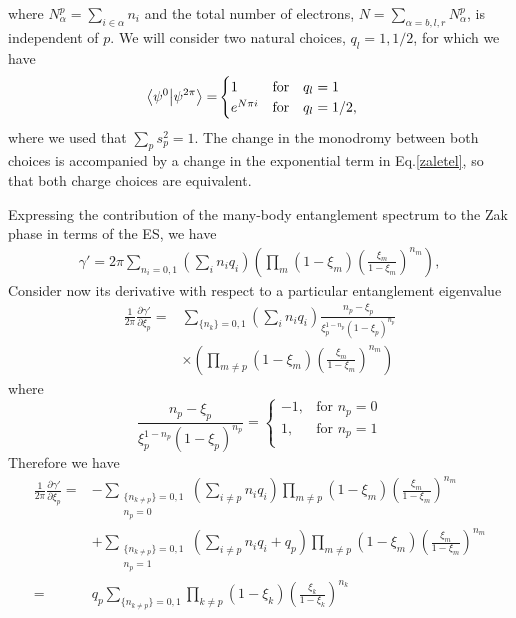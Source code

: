 \documentclass[twocolumn,amsmath,longbibliography,amssymb,superscriptaddress]{revtex4-1}
\begin{document}
where $N^p_\alpha = \sum_{i \in \alpha} n_i$ and the total number of electrons, $N = \sum_{\alpha = b,l,r} N^p_\alpha$, is independent of $p$. We will consider two natural choices, $q_l = 1,1/2$, for which we have
\begin{align}
\bra{\psi^0}\ket{\psi^{2\pi}} =& 
\begin{cases}
1 & \text{for} \quad q_l = 1 \\
e^{N\pi i} & \text{for} \quad q_l = 1/2,
\end{cases}
\end{align}
where we used that $\sum_p s_p^2 = 1$. The change in the monodromy between both choices is accompanied by a change in the exponential term in Eq.\ref{zaletel}, so that both charge choices are equivalent.

Expressing the contribution of the many-body entanglement spectrum to the Zak phase in terms of the ES, we have
\begin{align*}
\gamma' = 2\pi \sum_{n_i = 0,1} \left(\sum_{i } n_i q_i\right) \left(\prod_m (1- \xi_m)\left(\frac{\xi_m}{1-\xi_m} \right)^{n_m} \right) ,
\end{align*} 
Consider now its derivative with respect to a particular entanglement eigenvalue
\begin{align}
\frac{1}{2\pi}\frac{\partial \gamma'}{\partial \xi_p} =& \sum_{\{n_k\}=0,1}\left(\sum_{i } n_i q_i\right)\frac{n_p - \xi_p}{\xi_p^{1-n_p}(1-\xi_p)^{n_p}}\\
&\times \left(\prod_{m\neq p} (1- \xi_m)\left(\frac{\xi_m}{1-\xi_m} \right)^{n_m} \right)
\end{align}
where
\begin{equation}
 \frac{n_p - \xi_p}{\xi_p^{1-n_p}(1-\xi_p)^{n_p}} = 
  \begin{cases}
    -1, & \text{for } n_p=0 \\
    1, & \text{for } n_p = 1 \\
  \end{cases}	
\end{equation}
Therefore we have
\begin{align*}
\frac{1}{2\pi}\frac{\partial \gamma'}{\partial \xi_p} =& -\sum_{\substack{\{n_{k\neq p}\}=0,1 \\ n_p = 0}}\left(\sum_{i \neq p} n_i q_i\right)\prod_{m\neq p} (1-\xi_m)\left( \frac{\xi_m}{1-\xi_m} \right)^{n_m} \\
&+ \sum_{\substack{\{n_{k\neq p}\}=0,1 \\ n_p = 1}}\left(\sum_{i \neq p} n_i q_i +q_p\right) \prod_{m\neq p} (1-\xi_m)\left( \frac{\xi_m}{1-\xi_m} \right)^{n_m} \\
=&q_p\sum_{\{n_{k\neq p}\}=0,1} \prod_{k\neq p} (1-\xi_k)\left( \frac{\xi_k}{1-\xi_k} \right)^{n_k} \\
\end{align*}
\end{document}
